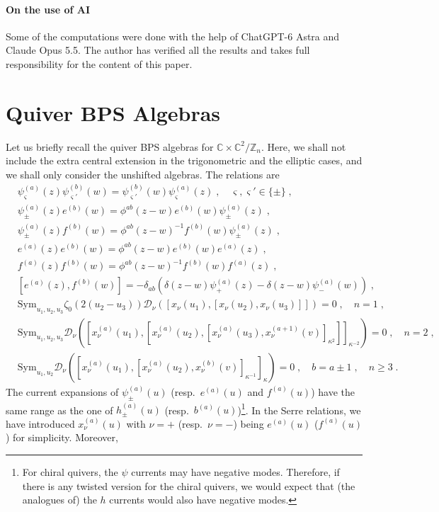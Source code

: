 \documentclass[11pt]{article}
\numberwithin{equation}{section}
\numberwithin{figure}{section}
\numberwithin{table}{section}
\begin{document}
\paragraph{On the use of AI} Some of the computations were done with the help of ChatGPT-6 Astra and Claude Opus 5.5. The author has verified all the results and takes full responsibility for the content of this paper.

\appendix

\section{Quiver BPS Algebras}\label{quiverbpsalg}
Let us briefly recall the quiver BPS algebras for $\mathbb{C}\times\mathbb{C}^2/\mathbb{Z}_n$. Here, we shall not include the extra central extension in the trigonometric and the elliptic cases, and we shall only consider the unshifted algebras. The relations are
\begin{subequations}
	\begin{align}
	&\psi^{(a)}_{\varsigma}(z)\psi^{(b)}_{\varsigma'}(w)=\psi^{(b)}_{\varsigma'}(w)\psi^{(a)}_{\varsigma}(z)\;,\quad\varsigma,\varsigma'\in\{\pm\}\;,\\
	&\psi^{(a)}_{\pm}(z)e^{(b)}(w)=\phi^{ab}(z-w)e^{(b)}(w)\psi^{(a)}_{\pm}(z)\;,\\
	&\psi^{(a)}_{\pm}(z)f^{(b)}(w)=\phi^{ab}(z-w)^{-1}f^{(b)}(w)\psi^{(a)}_{\pm}(z)\;,\\
	&e^{(a)}(z)e^{(b)}(w)=\phi^{ab}(z-w)e^{(b)}(w)e^{(a)}(z)\;,\\
	&f^{(a)}(z)f^{(b)}(w)=\phi^{ab}(z-w)^{-1}f^{(b)}(w)f^{(a)}(z)\;,\\
	&\left[e^{(a)}(z),f^{(b)}(w)\right]=-\delta_{ab}\left(\delta(z-w)\psi^{(a)}_+(z)-\delta(z-w)\psi^{(a)}_-(w)\right)\;,\\
	&\mathrm{Sym}_{u_1,u_2,u_3}\zeta_0\left(2(u_2-u_3)\right)\mathscr{D}_\nu\left([x_\nu(u_1),[x_\nu(u_2),x_\nu(u_3)]]\right)=0\;,\quad n=1\;,\\
	&\mathrm{Sym}_{u_1,u_2,u_3}\mathscr{D}_\nu\left(\left[x_\nu^{(a)}(u_1),\left[x_\nu^{(a)}(u_2),\left[x_\nu^{(a)}(u_3),x_\nu^{(a+1)}(v)\right]_{\kappa^2}\right]\right]_{\kappa^{-2}}\right)=0\;,\quad n=2\;,\\
	&\mathrm{Sym}_{u_1,u_2}\mathscr{D}_\nu\left(\left[x_\nu^{(a)}(u_1),\left[x_\nu^{(a)}(u_2),x_\nu^{(b)}(v)\right]_{\kappa^{-1}}\right]_{\kappa}\right)=0\;,\quad b=a\pm1\;,\quad n\geq3\;.
    \end{align}
\end{subequations}
The current expansions of $\psi_\pm^{(a)}(u)$ (resp.~$e^{(a)}(u)$ and $f^{(a)}(u)$) have the same range as the one of $h_\pm^{(a)}(u)$ (resp.~$b^{(a)}(u)$)\footnote{For chiral quivers, the $\psi$ currents may have negative modes. Therefore, if there is any twisted version for the chiral quivers, we would expect that (the analogues of) the $h$ currents would also have negative modes.}. In the Serre relations, we have introduced $x_\nu^{(a)}(u)$ with $\nu=+$ (resp.~$\nu=-$) being $e^{(a)}(u)$ ($f^{(a)}(u)$) for simplicity. Moreover,
\end{document}
